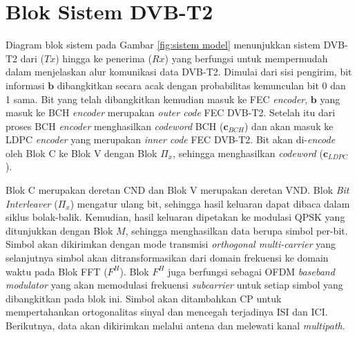 \section{Blok Sistem DVB-T2}

Diagram blok sistem pada Gambar \ref{fig:sistem model} menunjukkan sistem DVB-T2 dari  ($Tx$) hingga ke penerima ($Rx$) yang berfungsi untuk mempermudah dalam menjelaskan alur komunikasi data DVB-T2. Dimulai dari sisi pengirim, bit informasi $\mathbf{b}$ dibangkitkan secara acak dengan probabilitas kemunculan bit 0 dan 1 sama. Bit yang telah dibangkitkan kemudian masuk ke FEC \textit{encoder}, $\mathbf{b}$ yang masuk ke BCH \textit{encoder} merupakan \textit{outer code} FEC DVB-T2. Setelah itu dari proses BCH \textit{encoder} menghasilkan \textit{codeword} BCH ($\mathbf{c}_{BCH}$) dan akan masuk ke LDPC \textit{encoder} yang merupakan \textit{inner code} FEC DVB-T2. Bit akan di-\textit{encode} oleh Blok C ke Blok V dengan Blok $\Pi_{x}$, sehingga menghasilkan \textit{codeword} ($\mathbf{c}_{LDPC}$). 

Blok C merupakan deretan CND dan Blok V merupakan deretan VND. Blok \textit{Bit Interleaver} ($\Pi_{x}$) mengatur ulang bit, sehingga hasil keluaran dapat dibaca dalam siklus bolak-balik. Kemudian, hasil keluaran dipetakan ke modulasi QPSK yang ditunjukkan dengan Blok $M$, sehingga menghasilkan data berupa simbol per-bit. Simbol akan dikirimkan dengan mode transmisi \textit{orthogonal multi-carrier} yang selanjutnya simbol akan ditransformasikan dari domain frekuensi ke domain waktu pada Blok FFT ($F^{H}$). Blok $F^{H}$ juga berfungsi sebagai OFDM \textit{baseband modulator} yang akan memodulasi frekuensi \textit{subcarrier} untuk setiap simbol yang dibangkitkan pada blok ini. Simbol akan ditambahkan CP untuk mempertahankan  ortogonalitas sinyal dan mencegah terjadinya ISI dan ICI. Berikutnya, data akan dikirimkan melalui antena dan melewati kanal \textit{multipath}.

